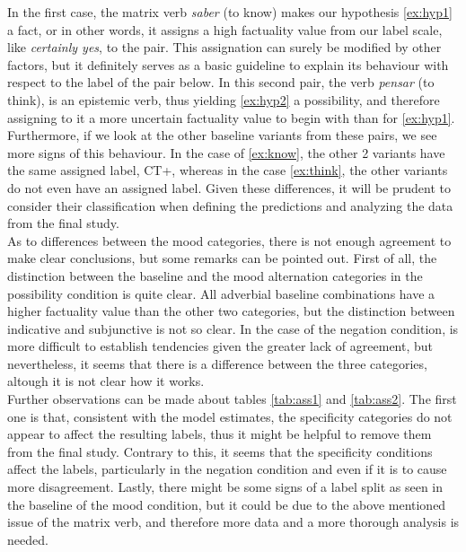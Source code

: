 In the first case, the matrix verb \textit{saber} (to know) makes our hypothesis \ref{ex:hyp1} a fact, or in other words, it assigns a high factuality value from our label scale, like \textit{certainly yes}, to the pair. This assignation can surely be modified by other factors, but it definitely serves as a basic guideline to explain its behaviour with respect to the label of the pair below. In this second pair, the verb \textit{pensar} (to think), is an epistemic verb, thus yielding \ref{ex:hyp2} a possibility, and therefore assigning to it a more uncertain factuality value to begin with than for \ref{ex:hyp1}. Furthermore, if we look at the other baseline variants from these pairs, we see more signs of this behaviour. In the case of \ref{ex:know}, the other 2 variants have the same assigned label, CT+, whereas in the case \ref{ex:think}, the other variants do not even have an assigned label. Given these differences, it will be prudent to consider their classification when defining the predictions and analyzing the data from the final study.\\

As to differences between the mood categories, there is not enough agreement to make clear conclusions, but some remarks can be pointed out. First of all, the distinction between the baseline and the mood alternation categories in the possibility condition is quite clear. All adverbial baseline combinations have a higher factuality value than the other two categories, but the distinction between indicative and subjunctive is not so clear. In the case of the negation condition, is more difficult to establish tendencies given the greater lack of agreement, but nevertheless, it seems that there is a difference between the three categories, altough it is not clear how it works.\\ 

Further observations can be made about tables \ref{tab:ass1} and \ref{tab:ass2}. The first one is that, consistent with the model estimates, the specificity categories do not appear to affect the resulting labels, thus it might be helpful to remove them from the final study. Contrary to this, it seems that the specificity conditions affect the labels, particularly in the negation condition and even if it is to cause more disagreement. Lastly, there might be some signs of a label split as seen in the baseline of the mood condition, but it could be due to the above mentioned issue of the matrix verb, and therefore more data and a more thorough analysis is needed.\\ 

